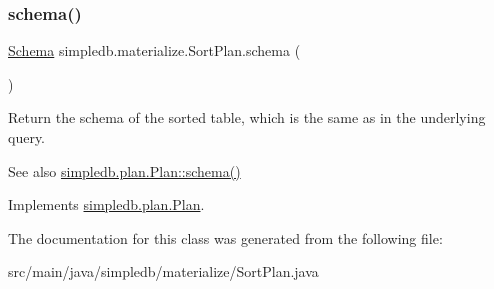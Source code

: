 \mbox{\label{classsimpledb_1_1materialize_1_1SortPlan_a38d147acf86926b81ce04c9ba6216e63}} 
\subsubsection{\texorpdfstring{schema()}{schema()}}
{\footnotesize\ttfamily \hyperlink{classsimpledb_1_1record_1_1Schema}{Schema} simpledb.\+materialize.\+Sort\+Plan.\+schema (\begin{DoxyParamCaption}{ }\end{DoxyParamCaption})\hspace{0.3cm}{\ttfamily [inline]}}

Return the schema of the sorted table, which is the same as in the underlying query. \begin{DoxySeeAlso}{See also}
\hyperlink{interfacesimpledb_1_1plan_1_1Plan_ad0ee1aa2c4e7147e9f8fc6f3301fa986}{simpledb.\+plan.\+Plan\+::schema()} 
\end{DoxySeeAlso}


Implements \hyperlink{interfacesimpledb_1_1plan_1_1Plan_ad0ee1aa2c4e7147e9f8fc6f3301fa986}{simpledb.\+plan.\+Plan}.



The documentation for this class was generated from the following file\+:\begin{DoxyCompactItemize}
\item 
src/main/java/simpledb/materialize/Sort\+Plan.\+java\end{DoxyCompactItemize}
